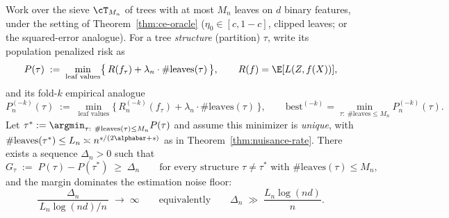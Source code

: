 \begin{assumption}\label{assump:margin}
Work over the sieve $\cT_{M_n}$ of trees with at most $M_n$ leaves on $d$ binary
features, under the setting of Theorem~\ref{thm:ce-oracle}
($\eta_0\in[c,1-c]$, clipped leaves; or the squared-error analogue). For a tree
\emph{structure} (partition) $\tau$, write its population penalized risk as
\begin{equation}\label{eq:pop-pen}
  P(\tau) \;:=\; \min_{\text{leaf values}}
     \bigl\{\, R(f_\tau) + \lambda_n\cdot\#\mathrm{leaves}(\tau)\,\bigr\},
  \qquad R(f) = \E[L(Z,f(X))],
\end{equation}
and its fold-$k$ empirical analogue
\begin{equation}\label{eq:emp-pen}
  P_n^{(-k)}(\tau)
  \;:=\; \min_{\text{leaf values}}
     \bigl\{\, R_n^{(-k)}(f_\tau) + \lambda_n\cdot\#\mathrm{leaves}(\tau)\,\bigr\},
  \qquad
  \text{best}^{(-k)} = \min_{\tau:\ \#\mathrm{leaves}\le M_n} P_n^{(-k)}(\tau).
\end{equation}
Let $\tau^\ast := \argmin_{\tau:\ \#\mathrm{leaves}(\tau)\le M_n} P(\tau)$ and
assume this minimizer is \emph{unique}, with
$\#\mathrm{leaves}(\tau^\ast)\le L_n\asymp
n^{s/(2\alphabar+s)}$ as in Theorem~\ref{thm:nuisance-rate}. There exists a
sequence $\Delta_n>0$ such that
\begin{equation}\label{eq:margin}
  G_\tau\;:=\;P(\tau) - P(\tau^\ast)\;\ge\;\Delta_n
  \qquad\text{for every structure } \tau\neq\tau^\ast
  \text{ with } \#\mathrm{leaves}(\tau)\le M_n,
\end{equation}
and the margin dominates the estimation noise floor:
\begin{equation}\label{eq:margin-rate}
  \frac{\Delta_n}{\, L_n\log(nd)/n\,}\;\longrightarrow\;\infty
  \qquad\text{equivalently}\qquad
  \Delta_n \;\gg\; \frac{L_n\log(nd)}{n}.
\end{equation}
\end{assumption}

